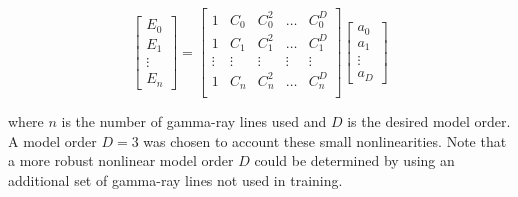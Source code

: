 \begin{equation}
    \begin{bmatrix}
        E_0 \\ E_1 \\ \vdots \\ E_n
    \end{bmatrix} =
    \begin{bmatrix}
        1 & C_0 & C_0^2 & \dots & C_0^D \\
        1 & C_1 & C_1^2 & \dots & C_1^D \\
        \vdots & \vdots & \vdots & \vdots & \vdots \\
        1 & C_n & C_n^2 & \dots & C_n^D \\
    \end{bmatrix}
    \begin{bmatrix}
        a_0 \\ a_1 \\ \vdots \\ a_D
    \end{bmatrix}
\end{equation}

where $n$ is the number of gamma-ray lines used and $D$ is the desired model
order. A model order $D = 3$ was chosen to account these small nonlinearities.
Note that a more robust nonlinear model order $D$ could be determined by using
an additional set of gamma-ray lines not used in training.

